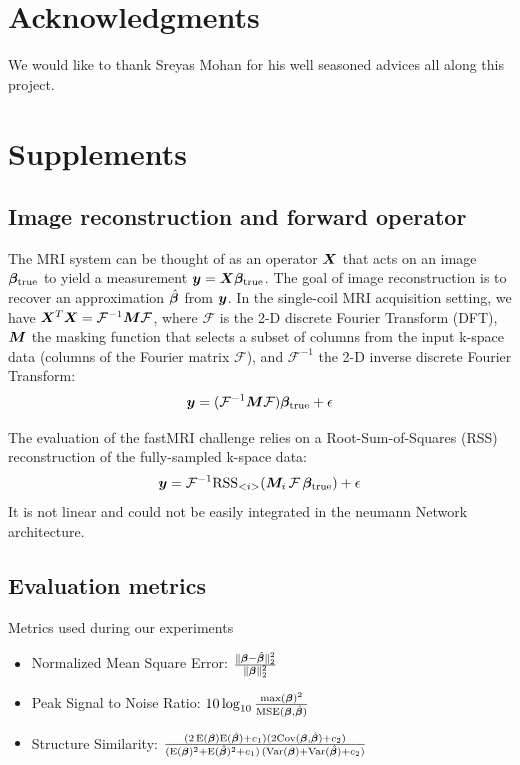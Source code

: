 \documentclass{article}
\begin{document}
\section{Acknowledgments}
We would like to thank Sreyas Mohan for his well seasoned advices all along this project.
\newpage
\nocite{*}



\section{Supplements}
\subsection{Image reconstruction and forward operator}
The MRI system can be thought of as an operator $\bm{X}$ that acts on an image $\bm{\beta}_{\text{true}}$ to yield a measurement $\bm{y}= \bm{X} \bm{\beta}_{\text{true}}$.
The goal of image reconstruction is to recover an approximation $\hat{\bm{\beta}}$ from $\bm{y}$.
In the single-coil MRI acquisition setting, we have $\bm{X}^T \bm{X} = \mathcal{F}^{-1} \bm{M} \mathcal{F}$, where $\mathcal{F}$ is the 2-D discrete Fourier Transform (DFT), $\bm{M}$ the masking function that selects a subset of columns from the input k-space data (columns of the Fourier matrix  $\mathcal{F}$), and $\mathcal{F}^{-1}$ the 2-D inverse discrete Fourier Transform:
$$
	\bm{y}	= (\mathcal{F}^{-1} \bm{M} \mathcal{F}) \bm{\beta}_{\text{true}} + \epsilon			
$$
 
The evaluation of the fastMRI challenge relies on a Root-Sum-of-Squares (RSS) reconstruction of the fully-sampled k-space data:
$$
	\bm{y}	= \mathcal{F}^{-1} \text{RSS}_{<i>} (\bm{M}_i \, \mathcal{F} \, \bm{\beta}_{\text{true}}) + \epsilon			
$$
It is not linear and could not be easily integrated in the neumann Network architecture.
 
\subsection{Evaluation metrics}
Metrics used during our experiments
\begin{itemize}
	\item Normalized Mean Square Error: $\frac{ \| \bm{\beta} - \hat{\bm{\beta}} \|_2^2 } { \|  \bm{\beta} \|_2^2 }$
	\item Peak Signal to Noise Ratio: $10 \log_{10} \frac {\max({\bm{\beta}})^2 } {\mathrm{MSE} (\bm{\beta}, \hat{\bm{\beta}})}$
	\item Structure Similarity: $\frac{ ( 2 \, \mathrm{E}(\bm{\beta})  \mathrm{E}( \hat{\bm{\beta}}) + c_1) (2 \mathrm{Cov}(\bm{\beta},  \hat{\bm{\beta}}) + c_2) } { (\mathrm{E}(\bm{\beta})^2 +  \mathrm{E}( \hat{\bm{\beta}})^2 + c_1) \, (\mathrm{Var}(\bm{\beta}) +  \mathrm{Var}( \hat{\bm{\beta}}) + c_2) }$
\end{itemize}
\end{document}
